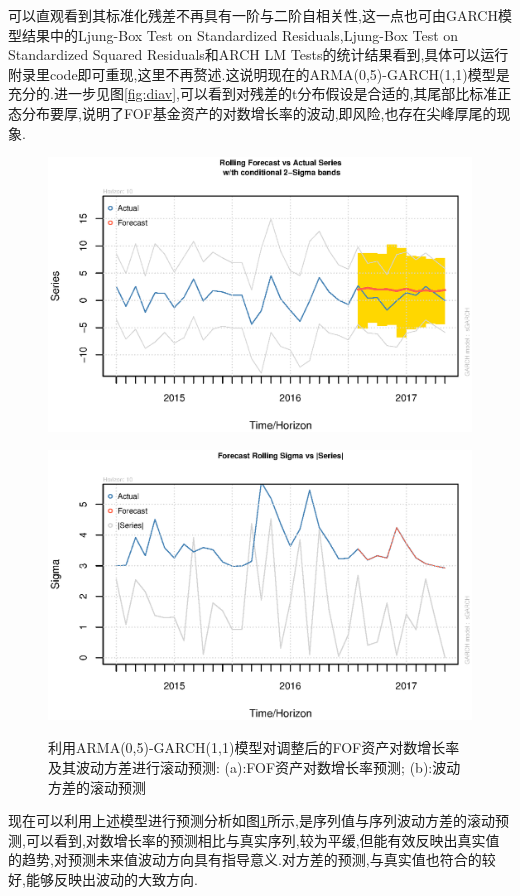 可以直观看到其标准化残差不再具有一阶与二阶自相关性,这一点也可由GARCH模型结果中的Ljung-Box Test on Standardized Residuals,Ljung-Box Test on Standardized Squared Residuals和ARCH LM Tests的统计结果看到,具体可以运行附录里code即可重现,这里不再赘述.这说明现在的ARMA(0,5)-GARCH(1,1)模型是充分的.进一步见图\ref{fig:diav},可以看到对残差的t分布假设是合适的,其尾部比标准正态分布要厚,说明了FOF基金资产的对数增长率的波动,即风险,也存在尖峰厚尾的现象.
\begin{figure}[h!]
	\begin{minipage}[ht]{0.48\textwidth}
		\centering
		\includegraphics[width=\textwidth]{pic/ast/fastroll}
		\subcaption{}\label{fastroll}
	\end{minipage}%
	\hspace{0.04\textwidth}
	\begin{minipage}[ht]{0.48\textwidth}
		\centering
		\includegraphics[width=\textwidth]{pic/ast/fastrollv}
		\subcaption{}\label{fastrollv}
	\end{minipage}
	\caption{利用ARMA(0,5)-GARCH(1,1)模型对调整后的FOF资产对数增长率及其波动方差进行滚动预测: (a):FOF资产对数增长率预测; (b):波动方差的滚动预测} \label{f}
\end{figure}
\par 现在可以利用上述模型进行预测分析如图\ref{f}所示,是序列值与序列波动方差的滚动预测,可以看到,对数增长率的预测相比与真实序列,较为平缓,但能有效反映出真实值的趋势,对预测未来值波动方向具有指导意义.对方差的预测,与真实值也符合的较好,能够反映出波动的大致方向.